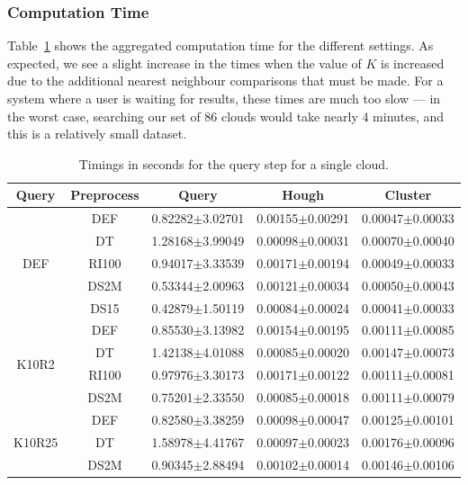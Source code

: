 \documentclass[11pt,a4paper]{kth-mag}
\begin{document}
\subsubsection{Computation Time}
Table~\ref{tbl:agg_time} shows the aggregated computation time for the different
settings. As expected, we see a slight increase in the times when the value of
$K$ is increased due to the additional nearest neighbour comparisons that must
be made. For a system where a user is waiting for results, these times are much
too slow --- in the worst case, searching our set of 86 clouds would take nearly
4 minutes, and this is a relatively small dataset.
\begin{table}
  \centering
  \begin{tabular}{cc|ccc}
    Query & Preprocess & Query & Hough & Cluster\\\hline
    \multirow{5}{*}{DEF}&DEF&0.82282$\pm$3.02701 & 0.00155$\pm$0.00291 & 0.00047$\pm$0.00033\\
          &DT&1.28168$\pm$3.99049 & 0.00098$\pm$0.00031 & 0.00070$\pm$0.00040\\
          &RI100&0.94017$\pm$3.33539 & 0.00171$\pm$0.00194 & 0.00049$\pm$0.00033\\
          &DS2M&0.53344$\pm$2.00963 & 0.00121$\pm$0.00034 & 0.00050$\pm$0.00043\\
          &DS15&0.42879$\pm$1.50119 & 0.00084$\pm$0.00024 & 0.00041$\pm$0.00033\\\hline
    \multirow{4}{*}{K10R2}&DEF&0.85530$\pm$3.13982 & 0.00154$\pm$0.00195 & 0.00111$\pm$0.00085\\
          &DT&1.42138$\pm$4.01088 & 0.00085$\pm$0.00020 & 0.00147$\pm$0.00073\\
          &RI100&0.97976$\pm$3.30173 & 0.00171$\pm$0.00122 & 0.00111$\pm$0.00081\\
          &DS2M&0.75201$\pm$2.33550 & 0.00085$\pm$0.00018 & 0.00111$\pm$0.00079\\\hline
    \multirow{3}{*}{K10R25}&DEF&0.82580$\pm$3.38259 & 0.00098$\pm$0.00047 & 0.00125$\pm$0.00101\\
          &DT&1.58978$\pm$4.41767 & 0.00097$\pm$0.00023 & 0.00176$\pm$0.00096\\
          &DS2M&0.90345$\pm$2.88494 & 0.00102$\pm$0.00014 & 0.00146$\pm$0.00106
  \end{tabular}
  \caption{Timings in seconds for the query step for a single cloud.}
  \label{tbl:agg_time}
\end{table}
\end{document}

